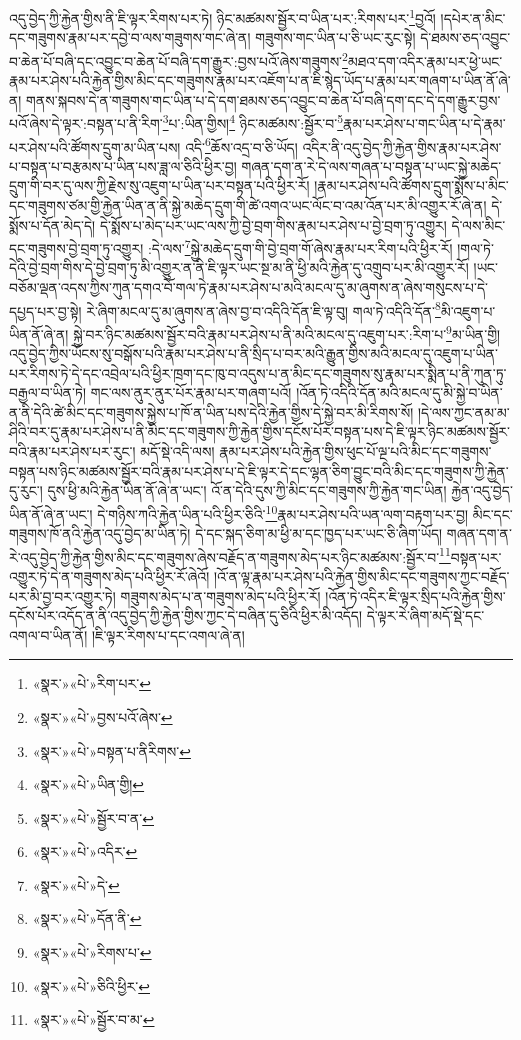 འདུ་བྱེད་ཀྱི་རྐྱེན་གྱིས་ནི་ཇི་ལྟར་རིགས་པར་ཏེ། ཉིང་མཚམས་སྦྱོར་བ་ཡིན་པར་:རིགས་པར་\footnote{«སྣར་»«པེ་»རིག་པར་}བྱའོ། །དཔེར་ན་མིང་དང་གཟུགས་རྣམ་པར་དབྱེ་བ་ལས་གཟུགས་གང་ཞེ་ན། གཟུགས་གང་ཡིན་པ་ཅི་ཡང་རུང་སྟེ། དེ་ཐམས་ཅད་འབྱུང་བ་ཆེན་པོ་བཞི་དང་འབྱུང་བ་ཆེན་པོ་བཞི་དག་རྒྱུར་:བྱས་པའོ་ཞེས་གཟུགས་\footnote{«སྣར་»«པེ་»བྱས་པའོ་ཞེས་}མཐའ་དག་འདིར་རྣམ་པར་ཕྱེ་ཡང་རྣམ་པར་ཤེས་པའི་རྐྱེན་གྱིས་མིང་དང་གཟུགས་རྣམ་པར་འཇོག་པ་ན་ཇི་སྙེད་ཡོད་པ་རྣམ་པར་གཞག་པ་ཡིན་ནོ་ཞེ་ན། གནས་སྐབས་དེ་ན་གཟུགས་གང་ཡིན་པ་དེ་དག་ཐམས་ཅད་འབྱུང་བ་ཆེན་པོ་བཞི་དག་དང་དེ་དག་རྒྱུར་བྱས་པའོ་ཞེས་དེ་ལྟར་:བསྟན་པ་ནི་རིག་\footnote{«སྣར་»«པེ་»བསྟན་པ་ནིརིགས་}པ་:ཡིན་གྱིས།\footnote{«སྣར་»«པེ་»ཡིན་གྱི།} ཉིང་མཚམས་:སྦྱོར་བ་\footnote{«སྣར་»«པེ་»སྦྱོར་བ་ན་}རྣམ་པར་ཤེས་པ་གང་ཡིན་པ་དེ་རྣམ་པར་ཤེས་པའི་ཚོགས་དྲུག་མ་ཡིན་པས། འདི་\footnote{«སྣར་»«པེ་»འདིར་}ཆོས་འདྲ་བ་ཅི་ཡོད། འདིར་ནི་འདུ་བྱེད་ཀྱི་རྐྱེན་གྱིས་རྣམ་པར་ཤེས་པ་བསྟན་པ་བརྩམས་པ་ཡིན་པས་ཟླ་ལ་ཅིའི་ཕྱིར་བྱ། གཞན་དག་ན་རེ་དེ་ལས་གཞན་པ་བསྟན་པ་ཡང་སྐྱེ་མཆེད་དྲུག་གི་བར་དུ་ལས་ཀྱི་རྗེས་སུ་འཇུག་པ་ཡིན་པར་བསྟན་པའི་ཕྱིར་རོ། །རྣམ་པར་ཤེས་པའི་ཚོགས་དྲུག་སྨོས་པ་མིང་དང་གཟུགས་ཙམ་གྱི་རྐྱེན་ཡིན་ན་ནི་སྐྱེ་མཆེད་དྲུག་གི་ཚེ་འགའ་ཡང་ལོང་བ་འམ་འོན་པར་མི་འགྱུར་རོ་ཞེ་ན། དེ་སྨོས་པ་དོན་མེད་དེ། དེ་སྨོས་པ་མེད་པར་ཡང་ལས་ཀྱི་བྱེ་བྲག་གིས་རྣམ་པར་ཤེས་པ་བྱེ་བྲག་ཏུ་འགྱུར། དེ་ལས་མིང་དང་གཟུགས་བྱེ་བྲག་ཏུ་འགྱུར། :དེ་ལས་\footnote{«སྣར་»«པེ་»དེ་}སྐྱེ་མཆེད་དྲུག་གི་བྱེ་བྲག་གོ་ཞེས་རྣམ་པར་རིག་པའི་ཕྱིར་རོ། །གལ་ཏེ་དེའི་བྱེ་བྲག་གིས་དེ་བྱེ་བྲག་ཏུ་མི་འགྱུར་ན་ནི་ཇི་ལྟར་ཡང་སྔ་མ་ནི་ཕྱི་མའི་རྐྱེན་དུ་འགྲུབ་པར་མི་འགྱུར་རོ། །ཡང་བཅོམ་ལྡན་འདས་ཀྱིས་ཀུན་དགའ་བོ་གལ་ཏེ་རྣམ་པར་ཤེས་པ་མའི་མངལ་དུ་མ་ཞུགས་ན་ཞེས་གསུངས་པ་དེ་དཔྱད་པར་བྱ་སྟེ། རེ་ཞིག་མངལ་དུ་མ་ཞུགས་ན་ཞེས་བྱ་བ་འདིའི་དོན་ཇི་ལྟ་བུ། གལ་ཏེ་འདིའི་དོན་\footnote{«སྣར་»«པེ་»དོན་ནི་}མི་འཇུག་པ་ཡིན་ནོ་ཞེ་ན། སྐྱེ་བར་ཉིང་མཚམས་སྦྱོར་བའི་རྣམ་པར་ཤེས་པ་ནི་མའི་མངལ་དུ་འཇུག་པར་:རིག་པ་\footnote{«སྣར་»«པེ་»རིགས་པ་}མ་ཡིན་གྱི། འདུ་བྱེད་ཀྱིས་ཡོངས་སུ་བསྒོས་པའི་རྣམ་པར་ཤེས་པ་ནི་སྲིད་པ་བར་མའི་རྒྱུན་གྱིས་མའི་མངལ་དུ་འཇུག་པ་ཡིན་པར་རིགས་ཏེ་དེ་དང་འབྲེལ་པའི་ཕྱིར་ཁྲག་དང་ཁུ་བ་འདུས་པ་ན་མིང་དང་གཟུགས་སུ་རྣམ་པར་སྨིན་པ་ནི་ཀུན་ཏུ་བརྒྱལ་བ་ཡིན་ཏེ། གང་ལས་ནུར་ནུར་པོར་རྣམ་པར་གཞག་པའོ། །འོན་ཏེ་འདིའི་དོན་མའི་མངལ་དུ་མི་སྐྱེ་བ་ཡིན་ན་ནི་དེའི་ཚེ་མིང་དང་གཟུགས་སྐྱེས་པ་ཁོ་ན་ཡིན་པས་དེའི་རྐྱེན་གྱིས་དེ་སྐྱེ་བར་མི་རིགས་སོ། །དེ་ལས་ཀྱང་ནམ་མ་ཤིའི་བར་དུ་རྣམ་པར་ཤེས་པ་ནི་མིང་དང་གཟུགས་ཀྱི་རྐྱེན་གྱིས་དངོས་པོར་བསྟན་པས་དེ་ཇི་ལྟར་ཉིང་མཚམས་སྦྱོར་བའི་རྣམ་པར་ཤེས་པར་རུང་། མདོ་སྡེ་འདི་ལས། རྣམ་པར་ཤེས་པའི་རྐྱེན་གྱིས་ཕུང་པོ་ལྔ་པའི་མིང་དང་གཟུགས་བསྟན་པས་ཉིང་མཚམས་སྦྱོར་བའི་རྣམ་པར་ཤེས་པ་དེ་ཇི་ལྟར་དེ་དང་ལྷན་ཅིག་བྱུང་བའི་མིང་དང་གཟུགས་ཀྱི་རྐྱེན་དུ་རུང་། དུས་ཕྱི་མའི་རྐྱེན་ཡིན་ནོ་ཞེ་ན་ཡང་། འོ་ན་དེའི་དུས་ཀྱི་མིང་དང་གཟུགས་ཀྱི་རྐྱེན་གང་ཡིན། རྐྱེན་འདུ་བྱེད་ཡིན་ནོ་ཞེ་ན་ཡང་། དེ་གཉིས་ཀའི་རྐྱེན་ཡིན་པའི་ཕྱིར་ཅིའི་\footnote{«སྣར་»«པེ་»ཅིའི་ཕྱིར་}རྣམ་པར་ཤེས་པའི་ཡན་ལག་བརྟག་པར་བྱ། མིང་དང་གཟུགས་ཁོ་ནའི་རྐྱེན་འདུ་བྱེད་མ་ཡིན་ཏེ། དེ་དང་སྐད་ཅིག་མ་ཕྱི་མ་དང་ཁྱད་པར་ཡང་ཅི་ཞིག་ཡོད། གཞན་དག་ན་རེ་འདུ་བྱེད་ཀྱི་རྐྱེན་གྱིས་མིང་དང་གཟུགས་ཞེས་བརྗོད་ན་གཟུགས་མེད་པར་ཉིང་མཚམས་:སྦྱོར་བ་\footnote{«སྣར་»«པེ་»སྦྱོར་བ་མ་}བསྟན་པར་འགྱུར་ཏེ་དེ་ན་གཟུགས་མེད་པའི་ཕྱིར་རོ་ཞེའོ། །འོ་ན་ལྟ་རྣམ་པར་ཤེས་པའི་རྐྱེན་གྱིས་མིང་དང་གཟུགས་ཀྱང་བརྗོད་པར་མི་བྱ་བར་འགྱུར་ཏེ། གཟུགས་མེད་པ་ན་གཟུགས་མེད་པའི་ཕྱིར་རོ། །འོན་ཏེ་འདིར་ཇི་ལྟར་སྲིད་པའི་རྐྱེན་གྱིས་དངོས་པོར་འདོད་ན་ནི་འདུ་བྱེད་ཀྱི་རྐྱེན་གྱིས་ཀྱང་དེ་བཞིན་དུ་ཅིའི་ཕྱིར་མི་འདོད། དེ་ལྟར་རེ་ཞིག་མདོ་སྡེ་དང་འགལ་བ་ཡིན་ནོ། །ཇི་ལྟར་རིགས་པ་དང་འགལ་ཞེ་ན། 